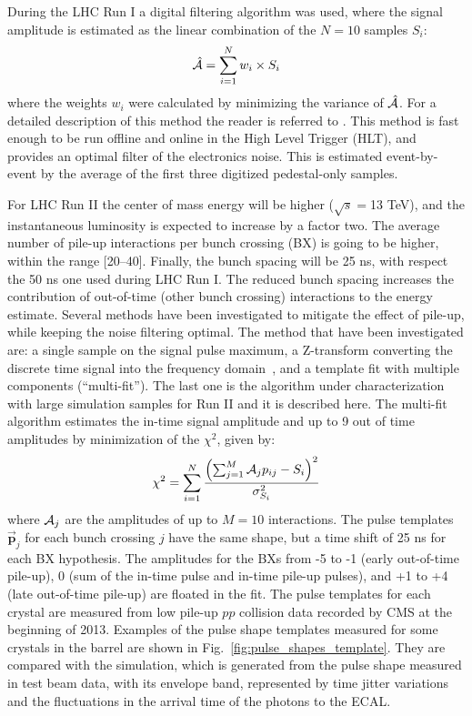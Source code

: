 \documentclass[journal]{IEEEtran}
\begin{document}
During the LHC Run I a digital filtering algorithm was used, where the signal amplitude is estimated as the linear combination of the $N=10$ samples $S_i$:
%
\begin{equation}
\hat{\cal A}=\sum_{i=1}^{N} w_i \times S_i
\end{equation}
%
where the weights $w_i$ were calculated by minimizing the variance of $\hat{\cal A}$. For a detailed description of this method the reader is referred to \cite{Bruneliere:2006ra}. This method is fast enough to be run offline and online in the High Level Trigger (HLT), and provides an optimal filter of the electronics noise. This is estimated event-by-event by the average of the first three digitized pedestal-only samples.

For LHC Run II the center of mass energy will be higher ($\sqrt{s}=$13 TeV), and the instantaneous luminosity is expected to increase by a factor two. The average number of pile-up interactions per bunch crossing (BX) is going to be higher, within the range [20--40]. Finally, the bunch spacing will be 25 ns, with respect the 50 ns one used during LHC Run I. The reduced bunch spacing increases the contribution of out-of-time (other bunch crossing) interactions to the energy estimate. Several methods have been investigated to mitigate the effect of pile-up, while keeping the noise filtering optimal. The method that have been investigated are: a single sample on the signal pulse maximum, a Z-transform converting the discrete time signal into the frequency domain~\cite{Gadomski:1992xu}, and a template fit with multiple components (``multi-fit''). The last one is the algorithm under characterization with large simulation samples for Run II and it is described here.
The multi-fit algorithm estimates the in-time signal amplitude and up to 9 out of time amplitudes by minimization of the $\chi^2$, given by:
\begin{equation}
\label{eqn:chi2multifit}
\chi^2 = \sum_{i=1}^{N} \frac{\left(\sum_{j=1}^M {\cal A}_{j}p_{ij} - S_i \right)^2}{\sigma^2_{S_i}}
\end{equation}
where ${\cal A}_{j}$ are the amplitudes of up to $M=10$ interactions. The pulse templates $\mathbf{\vec p}_j$ for each bunch crossing $j$ have the same shape, but a time shift of 25 ns for each BX hypothesis. The amplitudes for the BXs from -5 to -1 (early out-of-time pile-up), 0 (sum of the in-time pulse and in-time pile-up pulses), and +1 to +4 (late out-of-time pile-up) are floated in the fit.
The pulse templates for each crystal are measured from low pile-up $pp$ collision data recorded by CMS at the beginning of 2013. Examples of the pulse shape templates measured for some crystals in the barrel are shown in Fig.~\ref{fig:pulse_shapes_template}. They are compared with the simulation, which is generated from the pulse shape measured in test beam data, with its envelope band, represented by time jitter variations and the fluctuations in the arrival time of the photons to the ECAL.
\end{document}
